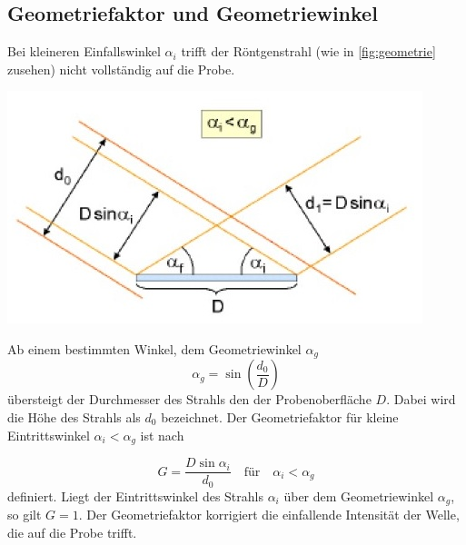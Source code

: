 \subsection{Geometriefaktor und Geometriewinkel}
Bei kleineren Einfallswinkel $\alpha_i$ trifft der Röntgenstrahl (wie in \autoref{fig:geometrie} zusehen) nicht vollständig auf die Probe.

\begin{minipage}{0.5\textwidth}
    \includegraphics[width=\textwidth]{content/data/geometriefaktor.jpg}
    \end{minipage}
    \begin{minipage}{0.5\textwidth}
    Ab einem bestimmten Winkel, dem Geometriewinkel $\alpha_g$
    \begin{equation}
        \alpha_g = \sin \left ( \frac{d_0}{D} \right )
    \end{equation}
    übersteigt der Durchmesser des Strahls den der Probenoberfläche $D$.
    Dabei wird die Höhe des Strahls als $d_0$ bezeichnet.
    Der Geometriefaktor für kleine Eintrittswinkel $\alpha_i < \alpha_g$ ist nach
\end{minipage}
\begin{equation}
    G = \frac{D \sin \alpha_i}{d_0} \quad \text{für} \quad \alpha_i < \alpha_g
    \label{eqn:geometriewinkel}
\end{equation}
definiert.
Liegt der Eintrittswinkel des Strahls $\alpha_i$ über dem Geometriewinkel $\alpha_g$, so gilt $G=1$.
Der Geometriefaktor korrigiert die einfallende Intensität der Welle, die auf die Probe trifft.
